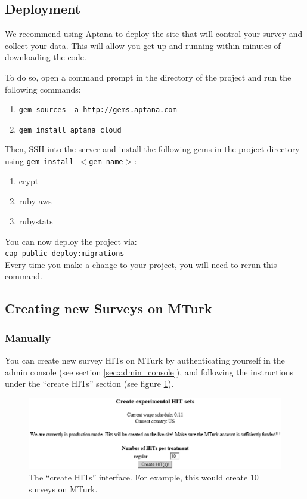 \documentclass[12pt]{article}
\begin{document}
\subsection{Deployment}\label{subsec:deployment}

We recommend using Aptana to deploy the site that will control your survey and collect your data. This will allow you get up and running within minutes of downloading the code.

To do so, open a command prompt in the directory of the project and run the following commands:

\begin{enumerate}
\item \tt{gem sources -a http://gems.aptana.com}
\item \tt{gem install aptana\_cloud}
\end{enumerate} 

Then, SSH into the server and install the following gems in the project directory using \texttt{gem install $<$gem name$>$}:

\begin{enumerate}
\item crypt
\item ruby-aws
\item rubystats
\end{enumerate}


You can now deploy the project via:\\

{\tt{cap public deploy:migrations}}\\

Every time you make a change to your project, you will need to rerun this command.

\subsection{Creating new Surveys on MTurk}

\subsubsection*{Manually}

You can create new survey HITs on MTurk by authenticating yourself in the admin console (see section \ref{sec:admin_console}), and following the instructions under the ``create HITs'' section (see figure \ref{fig:create_hits}).

\begin{figure}[htp]
\centering
\includegraphics[width=6in]{figs/create_hits.eps}
\caption{The ``create HITs'' interface. For example, this would create 10 surveys on MTurk.}
\label{fig:create_hits}
\end{figure}
\end{document}
